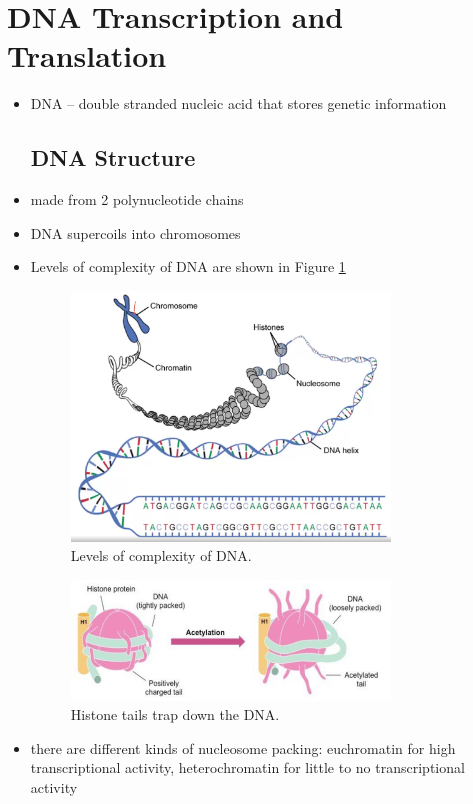 \documentclass[10pt]{article}
\begin{document}
\section{DNA Transcription and Translation}
\begin{itemize}
    \item DNA -- double stranded nucleic acid that stores genetic information
\subsection{DNA Structure}
    \item made from 2 polynucleotide chains
    \item DNA supercoils into chromosomes
    \item Levels of complexity of DNA are shown in Figure \ref{fig:DNA}
\begin{figure}[h]
    \centering
    \includegraphics[width=0.8\textwidth]{DNA}
    \caption{Levels of complexity of DNA.}
    \label{fig:DNA}
\end{figure}
\begin{figure}[h]
    \centering
    \includegraphics[width=0.8\textwidth]{histoneTails}
    \caption{Histone tails trap down the DNA.}
    \label{fig:histoneTails}
\end{figure}
\item there are different kinds of nucleosome packing: euchromatin for high transcriptional activity, heterochromatin for little to no transcriptional activity

\end{itemize}
\end{document}
